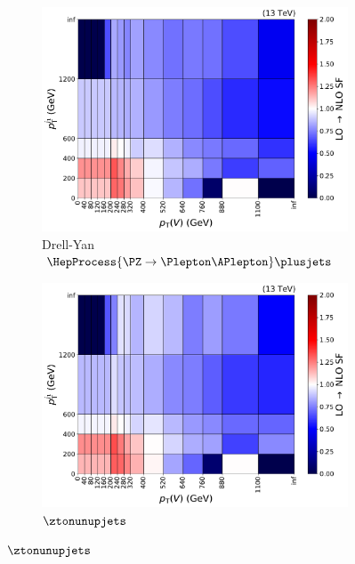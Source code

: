 \begin{figure}[htbp]
    \centering
    \begin{subfigure}[b]{0.45\textwidth}
        \includegraphics[width=\textwidth]{figures/nlo_k_factors/2D_zll.pdf}
        \caption{Drell-Yan $\HepProcess{\PZ \to \Plepton\APlepton}\plusjets$}
    \end{subfigure}
    \hspace{0.05\textwidth}
    \begin{subfigure}[b]{0.45\textwidth}
        \includegraphics[width=\textwidth]{figures/nlo_k_factors/2D_znunu.pdf}
        \caption{$\ztonunupjets$}
    \end{subfigure}


\end{figure}
